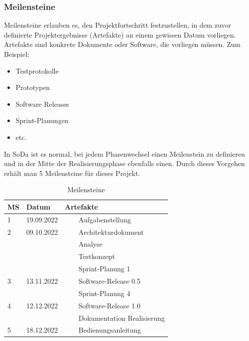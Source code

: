 \documentclass[a4paper, table]{article}
\newcommand{\tabitem}{~~\llap{\textbullet}~~}
\begin{document}
\newpage
\subsubsection*{Meilensteine}
Meilensteine erlauben es, den Projektfortschritt festzustellen, in dem zuvor definierte Projektergebnisse (Artefakte) an einem gewissen Datum vorliegen.\\
Artefakte sind konkrete Dokumente oder Software, die vorliegen müssen. Zum Beispiel:
\begin{itemize}
    \item Testprotokolle
    \item Prototypen
    \item Software Releases
    \item Sprint-Planungen
    \item etc.
\end{itemize}

In \gls{SoDa} ist es normal, bei jedem Phasenwechsel einen Meilenstein zu definieren und in der Mitte der Realisierungsphase ebenfalls einen. \autocite{jenny_projektmanagement_2016} %
Durch dieses Vorgehen erhält man 5 Meilensteine für dieses Projekt.

\begin{table}[h]
    \centering
    \begin{tabular}{|l|l|l|}
        \hline
        \rowcolor[gray]{.9} MS & Datum & Artefakte \\
        \hline
        1 & 19.09.2022 & \tabitem Aufgabenstellung \\
        \hline
        2 & 09.10.2022 & \tabitem Architekturdokument \\
         & & \tabitem Analyse \\
         & & \tabitem Testkonzept \\
         & & \tabitem Sprint-Planung 1 \\
        \hline
        3 & 13.11.2022 & \tabitem Software-Release 0.5 \\
         & & \tabitem Sprint-Planung 4 \\
        \hline
        4 & 12.12.2022 & \tabitem Software-Release 1.0 \\
         & & \tabitem Dokumentation Realisierung \\
        \hline
        5 & 18.12.2022 & \tabitem Bedienungsanleitung \\
        \hline
    \end{tabular}
    \caption{Meilensteine}
    \label{tab: Meilensteine}
\end{table}
\end{document}
